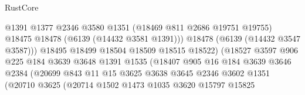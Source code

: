\begin{lexlean}{RustCore}
\begin{coremodule}
                                            @1391
                                            @1377
                                            @2346
                                            @3580
                                            @1351
                                            (@18469 @811 @2686 @19751 @19755)
                                            @18475
                                            @18478
                                            (@6139 (@14432 @3581 @1391)))
                                          @18478
                                          (@6139 (@14432 @3547 @3587)))
                                        @18495
                                        @18499
                                        @18504
                                        @18509
                                        @18515
                                        @18522)
                                      (@18527
                                        @3597
                                        @906
                                        @225
                                        @184
                                        @3639
                                        @3648
                                        @1391
                                        @1535
                                        (@18407
                                          @905
                                          @16
                                          @184
                                          @3639
                                          @3646
                                          @2384
                                          (@20699
                                            @843
                                            @11
                                            @15
                                            @3625
                                            @3638
                                            @3645
                                            @2346
                                            @3602
                                            @1351
                                            (@20710
                                              @3625
                                              (@20714
                                                @1502
                                                @1473
                                                @1035
                                                @3620
                                                @15797
                                                @15825

\end{coremodule}
\end{lexlean}
